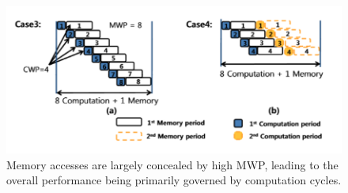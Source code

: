 \begin{figure}[htb]
    \centering
    \includegraphics[width=0.65\linewidth]{Figures/mwpgreaterthancwp.png}
	\caption{Memory accesses are largely concealed by high MWP, 
            leading to the overall performance being primarily governed by computation cycles.}
	\label{fig:mwpgreaterthancwp}
\end{figure}
